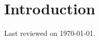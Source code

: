 \documentclass[12pt]{article}
\title{\documenttitlepage}
\date{\documentdate}
\begin{document}

    \maketitle
    \thispagestyle{empty}

    
    \begin{abstract}
        
    \end{abstract}


    \tableofcontents


    \newpage

    \section{Introduction}


    \newpage
    \thispagestyle{empty}

    \vspace*{\fill}

    \begin{center}
        Last reviewed on \today.
    \end{center}

    \vspace*{\fill}
\end{document}
